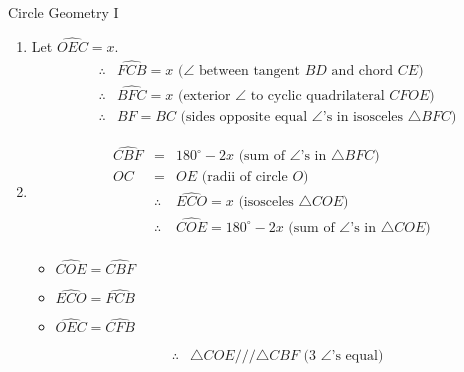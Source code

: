 \begin{wex}{%
Circle Geometry I}
{\begin{enumerate}
\item \setcounter{stepcounter}{1}
Let $\hat{OEC} = x$.
\begin{eqnarray*}
&\therefore& \hat{FCB} = x \mbox{ ($\angle$ between tangent $BD$ and chord $CE$)}\\
&\therefore& \hat{BFC} = x \mbox{ (exterior $\angle$ to cyclic quadrilateral $CFOE$)}\\
&\therefore& BF = BC \mbox{ (sides opposite equal $\angle$'s in isosceles $\triangle{BFC}$)}
\end{eqnarray*}

\item \setcounter{stepcounter}{1}
\begin{eqnarray*}
\hat{CBF} &=& 180^\circ - 2x \mbox{ (sum of $\angle$'s in $\triangle{BFC}$)}\\
OC &=& OE \mbox{ (radii of circle $O$)}\\
&\therefore& \hat{ECO} = x \mbox{ (isosceles $\triangle{COE}$)}\\
&\therefore& \hat{COE} = 180^\circ - 2x \mbox{ (sum of $\angle$'s in $\triangle{COE}$)}\\
\end{eqnarray*}
\begin{itemize}
\item $\hat{COE} = \hat{CBF}$
\item $\hat{ECO} = \hat{FCB}$
\item $\hat{OEC} = \hat{CFB}$
\end{itemize}
\begin{eqnarray*}
&\therefore& \triangle{COE} /// \triangle{CBF} \mbox{ (3 $\angle$'s equal)}\\
\end{eqnarray*}


\end{enumerate}}
\end{wex}
